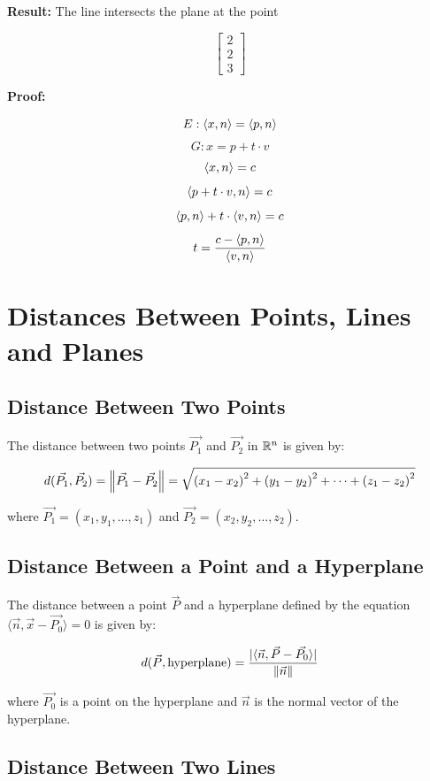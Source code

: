 \textbf{Result:} The line intersects the plane at the point

\[
	\begin{bmatrix} 2 \\ 2 \\ 3 \end{bmatrix}
\]

\textbf{Proof:}

\[
	E: \left\langle x, n\right\rangle = \left\langle p, n\right\rangle
\]
\[
	G: x = p + t \cdot v
\]
\[
	\left\langle x, n\right\rangle = c
\]
\[
	\left\langle p + t \cdot v, n\right\rangle = c
\]
\[
	\left\langle p, n\right\rangle + t \cdot \left\langle v, n\right\rangle = c
\]
\[
	t = \frac{c - \left\langle p, n\right\rangle}{\left\langle v, n\right\rangle}
\]

\QED

\section{Distances Between Points, Lines and Planes}

\subsection{Distance Between Two Points}

The distance between two points \(\vec{P_1}\) and \(\vec{P_2}\) in \(\mathbb{R}^n\) is given by:

\[
	d(\vec{P_1}, \vec{P_2}) = \left\| \vec{P_1} - \vec{P_2} \right\| = \sqrt{{(x_1 - x_2)}^2 + {(y_1 - y_2)}^2 + \cdots + {(z_1 - z_2)}^2}
\]

where \(\vec{P_1} = (x_1, y_1, \dots,z_1)\) and \(\vec{P_2} = (x_2, y_2, \dots,z_2)\).

\subsection{Distance Between a Point and a Hyperplane}

The distance between a point \(\vec{P}\) and a hyperplane defined by the equation \(\langle \vec{n}, \vec{x} - \vec{P_0} \rangle = 0\) is given by:

\[
	d(\vec{P}, \text{hyperplane}) = \frac{|\langle \vec{n}, \vec{P} - \vec{P_0} \rangle|}{\left\| \vec{n} \right\|}
\]

where \(\vec{P_0}\) is a point on the hyperplane and \(\vec{n}\) is the normal vector of the hyperplane.

\subsection{Distance Between Two Lines}

